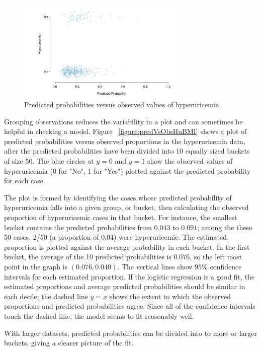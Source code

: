 \begin{figure}[!tbh]
  \centering
  \includegraphics[width=0.70\textwidth]
  {ch_logistic_regression_oi_biostat/figures/probVsObsHuBMI/probVsObshuBMI.pdf}
    \caption{Predicted probabilities versus observed values of hyperuricemia. }
    \label{figure:probVsObsHuBMI}
\end{figure}

Grouping observations reduces the variability in a plot and can sometimes be helpful in checking a model. Figure ~\ref{figure:predVsObsHuBMI} shows a plot of predicted probabilities versus observed proportions in the hyperuricemia data, after the predicted probabilities have been divided into 10 equally sized buckets of size 50.  The blue circles at $y = 0$ and $y = 1$ show the observed values of hyperuricemia (0 for "No", 1 for "Yes") plotted against the predicted probability for each case.

The plot is formed by identifying the cases whose predicted probability of hyperuricemia falls into a given group, or bucket, then calculating the observed proportion of hyperuricemic cases in that bucket.  For instance, the smallest bucket contains the predicted probabilities from $0.043$ to $0.091$; among the these 50 cases, 2/50 (a proportion of $0.04$) were hyperuricemic.  The estimated proportion is plotted against the average probability in each bucket. In the first bucket, the average of the 10 predicted probabilities is $0.076$, so the left most point in the graph is $(0.076, 0.040)$.  The vertical lines show $95\%$ confidence intervals for each estimated proportion.  If the logistic regression is a good fit, the estimated proportions and average predicted probabilities should be similar in each decile; the dashed line $y = x$ shows the extent to which the observed proportions and predicted probabilities agree.  Since all of  the confidence intervals touch the dashed line, the model seems to fit reasonably well.

With larger datasets, predicted probabilities can be divided into to more or larger buckets, giving a clearer picture of the fit.

